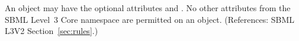 An \AlgebraicRule object may have the optional attributes  
and .  No other attributes from the SBML Level~3 Core
namespace are permitted on an \AlgebraicRule object.  (References: SBML
L3V2 Section~\ref{sec:rules}.)
